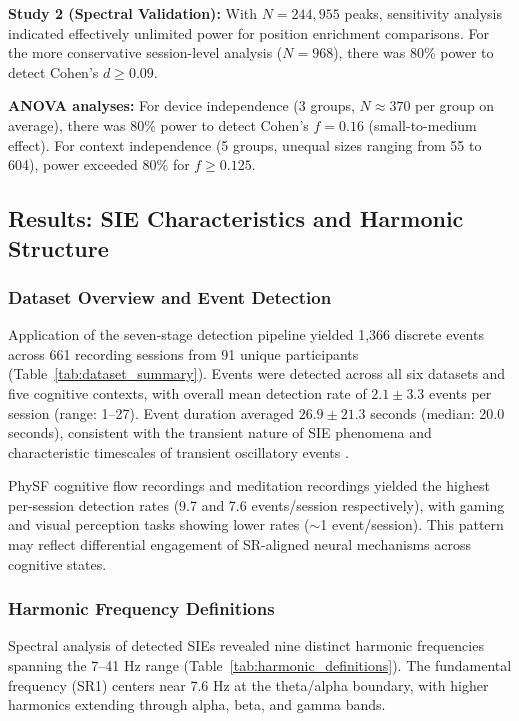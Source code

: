 \documentclass[11pt,a4paper]{article}
\begin{document}
\textbf{Study 2 (Spectral Validation):} With $N = 244,955$ peaks, sensitivity analysis indicated effectively unlimited power for position enrichment comparisons. For the more conservative session-level analysis ($N = 968$), there was 80\% power to detect Cohen's $d \geq 0.09$.

\textbf{ANOVA analyses:} For device independence (3 groups, $N \approx 370$ per group on average), there was 80\% power to detect Cohen's $f = 0.16$ (small-to-medium effect). For context independence (5 groups, unequal sizes ranging from 55 to 604), power exceeded 80\% for $f \geq 0.125$.

\subsection{Results: SIE Characteristics and Harmonic Structure}

\subsubsection{Dataset Overview and Event Detection}
Application of the seven-stage detection pipeline yielded 1,366 discrete events across 661 recording sessions from 91 unique participants (Table~\ref{tab:dataset_summary}). Events were detected across all six datasets and five cognitive contexts, with overall mean detection rate of $2.1 \pm 3.3$ events per session (range: 1--27). Event duration averaged $26.9 \pm 21.3$ seconds (median: 20.0 seconds), consistent with the transient nature of SIE phenomena and characteristic timescales of transient oscillatory events \parencite{siegel2012spectral}.

PhySF cognitive flow recordings and meditation recordings yielded the highest per-session detection rates (9.7 and 7.6 events/session respectively), with gaming and visual perception tasks showing lower rates ($\sim$1 event/session). This pattern may reflect differential engagement of SR-aligned neural mechanisms across cognitive states.

\subsubsection{Harmonic Frequency Definitions}
Spectral analysis of detected SIEs revealed nine distinct harmonic frequencies spanning the 7--41 Hz range (Table~\ref{tab:harmonic_definitions}). The fundamental frequency (SR1) centers near 7.6 Hz at the theta/alpha boundary, with higher harmonics extending through alpha, beta, and gamma bands.
\end{document}
